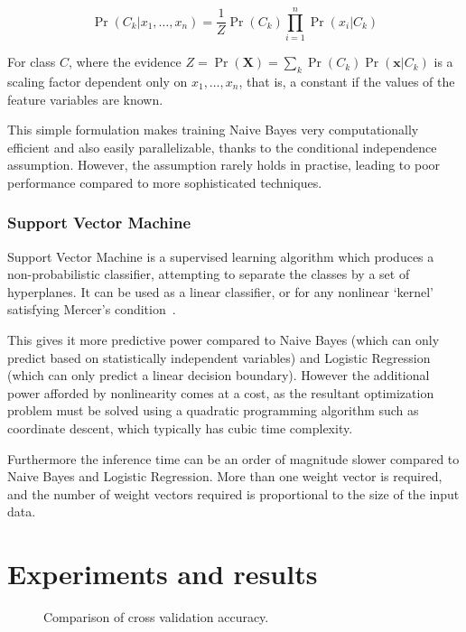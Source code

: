 \documentclass[landscape,twocolumn]{article}
\begin{document}
\begin{equation}
	\label{eq:naivebayes}
	\Pr\left(C_k|x_1,\ldots,x_n\right)=\frac{1}{Z}\Pr\left(C_k\right)\prod_{i=1}^n{\Pr\left(x_i|C_k\right)}
\end{equation}

For class $C$, where the evidence $Z=\Pr\left(\textbf{X}\right)=\sum_k{\Pr\left(C_k\right)\Pr\left(\textbf{x}|C_k\right)}$ is a scaling factor dependent only on $x_1,\ldots,x_n$, that is, a constant if the values of the feature variables are known.

This simple formulation makes training Naive Bayes very computationally efficient and also easily parallelizable, thanks to the conditional independence assumption. However, the assumption rarely holds in practise, leading to poor performance compared to more sophisticated techniques.

\subsubsection{Support Vector Machine}
Support Vector Machine is a supervised learning algorithm which produces a non-probabilistic classifier, attempting to separate the classes by a set of hyperplanes. It can be used as a linear classifier, or for any nonlinear `kernel' satisfying Mercer's condition~\cite{noble2006support}.

This gives it more predictive power compared to Naive Bayes (which can only predict based on statistically independent variables) and Logistic Regression (which can only predict a linear decision boundary). However the additional power afforded by nonlinearity comes at a cost, as the resultant optimization problem must be solved using a quadratic programming algorithm such as coordinate descent, which typically has cubic time complexity.

Furthermore the inference time can be an order of magnitude slower compared to Naive Bayes and Logistic Regression. More than one weight vector is required, and the number of weight vectors required is proportional to the size of the input data.

\section{Experiments and results}
\begin{figure}
	\caption{Comparison of cross validation accuracy.}\label{fig:accuracy}
\end{figure}
\end{document}

